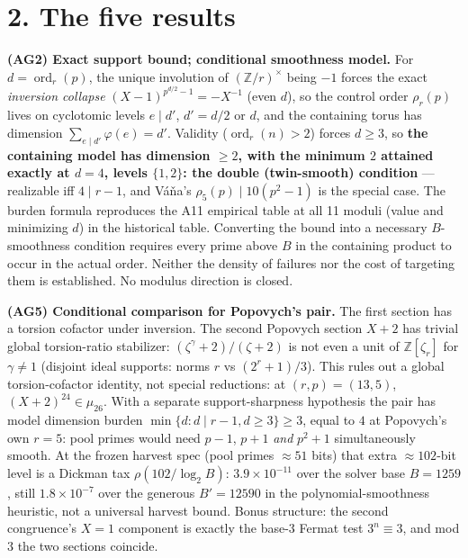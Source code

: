 \documentclass[10pt]{article}
\newcommand{\Z}{\mathbb{Z}}
\DeclareMathOperator{\ord}{ord}
\begin{document}
\section*{2. The five results}

\textbf{(AG2) Exact support bound; conditional smoothness model.}
For $d=\ord_r(p)$, the unique involution of $(\Z/r)^\times$
being $-1$ forces the exact \emph{inversion collapse}
$(X-1)^{p^{d/2}-1} = -X^{-1}$ (even $d$), so the control order
$\rho_r(p)$ lives on cyclotomic levels $e \mid d'$, $d' = d/2$ or $d$, and
the containing torus has dimension
$\sum_{e \mid d'} \varphi(e) = d'$. Validity ($\ord_r(n) > 2$) forces
$d \ge 3$, so \textbf{the containing model has dimension $\ge2$, with the
minimum $2$ attained exactly at $d = 4$, levels $\{1,2\}$: the double
(twin-smooth) condition} --- realizable iff $4 \mid r - 1$, and V\'a\v{n}a's
$\rho_5(p) \mid 10(p^2{-}1)$ is the special case. The burden formula
reproduces the A11 empirical table at all 11 moduli (value and minimizing
$d$) in the historical table. Converting the bound into a necessary
$B$-smoothness condition requires every prime above $B$ in the containing
product to occur in the actual order. Neither the density of failures nor
the cost of targeting them is established. No modulus direction is closed.

\textbf{(AG5) Conditional comparison for Popovych's pair.}
The first section has a torsion cofactor under inversion.
The second Popovych section $X+2$ has trivial global torsion-ratio
stabilizer: $(\zeta^\gamma{+}2)/(\zeta{+}2)$ is not even a unit of
$\Z[\zeta_r]$ for $\gamma \ne 1$ (disjoint ideal supports: norms $r$ vs
$(2^r{+}1)/3$). This rules out a global torsion-cofactor identity, not
special reductions: at $(r,p)=(13,5)$, $(X+2)^{24}\in\mu_{26}$.
With a separate support-sharpness hypothesis the pair has model dimension
burden $\min\{d : d \mid r{-}1, d \ge 3\} \ge 3$, equal to $4$ at Popovych's
own $r = 5$: pool primes would need $p-1$, $p+1$ \emph{and} $p^2+1$
simultaneously smooth. At the frozen harvest spec (pool primes
${\approx}51$ bits) that extra ${\approx}102$-bit level is a Dickman tax
$\rho(102/\log_2 B)$: $3.9\times10^{-11}$ over the solver base $B = 1259$,
still $1.8\times10^{-7}$ over the generous $B' = 12590$ in the
polynomial-smoothness heuristic, not a universal harvest bound.
Bonus structure: the second congruence's
$X{=}1$ component is exactly the base-3 Fermat test $3^n \equiv 3$, and
mod $3$ the two sections coincide.
\end{document}
